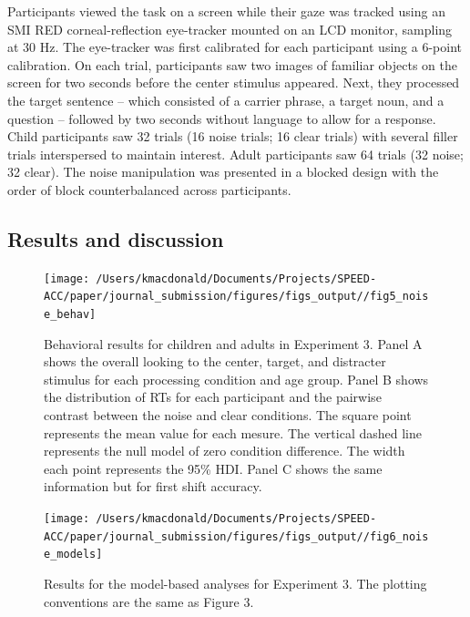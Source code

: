 \documentclass[english,floatsintext,man]{apa6}
\begin{document}
Participants viewed the task on a screen while their gaze was tracked
using an SMI RED corneal-reflection eye-tracker mounted on an LCD
monitor, sampling at 30 Hz. The eye-tracker was first calibrated for
each participant using a 6-point calibration. On each trial,
participants saw two images of familiar objects on the screen for two
seconds before the center stimulus appeared. Next, they processed the
target sentence -- which consisted of a carrier phrase, a target noun,
and a question -- followed by two seconds without language to allow for
a response. Child participants saw 32 trials (16 noise trials; 16 clear
trials) with several filler trials interspersed to maintain interest.
Adult participants saw 64 trials (32 noise; 32 clear). The noise
manipulation was presented in a blocked design with the order of block
counterbalanced across participants.

\hypertarget{results-and-discussion-2}{%
\subsection{Results and discussion}\label{results-and-discussion-2}}

\begin{figure}[!t]

{\centering \texttt{[image: /Users/kmacdonald/Documents/Projects/SPEED-ACC/paper/journal\_submission/figures/figs\_output//fig5\_noise\_behav]} 

}

\caption{Behavioral results for children and adults in Experiment 3. Panel A shows the overall looking to the center, target, and distracter stimulus for each processing condition and age group. Panel B shows the distribution of RTs for each participant and the pairwise contrast between the noise and clear conditions. The square point represents the mean value for each mesure. The vertical dashed line represents the null model of zero condition difference. The width each point represents the 95\% HDI. Panel C shows the same information but for first shift accuracy.}\label{fig:noise-acc-rt-plot}
\end{figure}

\begin{figure}[!t]

{\centering \texttt{[image: /Users/kmacdonald/Documents/Projects/SPEED-ACC/paper/journal\_submission/figures/figs\_output//fig6\_noise\_models]} 

}

\caption{Results for the model-based analyses for Experiment 3. The plotting conventions are the same as Figure 3.}\label{fig:noise-model-plots}
\end{figure}
\end{document}
